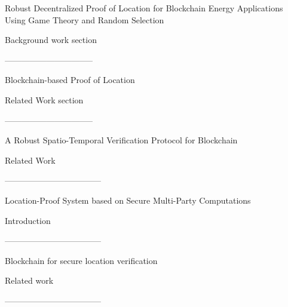 Robust Decentralized Proof of Location for Blockchain Energy Applications Using Game Theory and Random Selection

Background work section


--------------------------------

Blockchain-based Proof of Location

Related Work section


--------------------------------

A Robust Spatio-Temporal Verification Protocol for Blockchain

Related Work


-----------------------------------

Location-Proof System based on Secure Multi-Party Computations

Introduction

-----------------------------------

Blockchain for secure location verification

Related work

-----------------------------------

